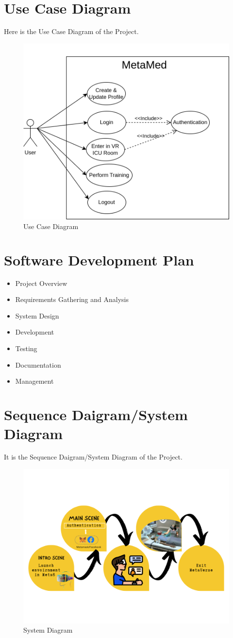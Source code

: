\section{Use Case Diagram}
Here is the Use Case Diagram of the Project.
\begin{figure}[h]
    \centering
    \includegraphics[width=0.5\linewidth]{Images/Use Case.drawio.png}
    \caption{Use Case Diagram}
    \label{fig:system-diagram}
\end{figure}

\section{Software Development Plan}
\begin{itemize}
    \item Project Overview 
    \item Requirements Gathering and Analysis
    \item System Design
    \item Development
    \item Testing
    \item Documentation
    \item Management
\end{itemize}

\section{Sequence Daigram/System Diagram}
It is the Sequence Daigram/System Diagram of the Project.
\begin{figure}[h]
    \centering
    \includegraphics[width=1\linewidth, height=0.65\linewidth]{Images/system.png}
    \caption{System Diagram}
\end{figure}
\newpage
